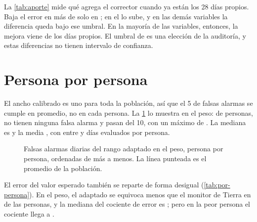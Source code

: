 La \cref{tab:aporte} mide qué agrega el corrector cuando ya están los 28 días propios. Baja el error en más de
 solo en ; en el  lo sube, y en las demás variables la
diferencia queda bajo ese umbral. En la mayoría de las variables, entonces, la mejora viene de los días propios. El
umbral de  es una elección de la auditoría, y estas diferencias no tienen intervalo de confianza.

\begin{table}[htbp]
\caption[Qué aporta el corrector de otros sujetos]{Error del valor esperado relativo al monitor de Tierra. El aporte del
corrector es la diferencia entre usar ambos y usar solo los días propios, con $k = 28$; se clasifica con una banda de
$\pm$.}
\label{tab:aporte}
\small

\end{table}

\section{Persona por persona}\label{sec:personas}

El ancho calibrado es uno para toda la población, así que el 5\pct{} de falsas alarmas se cumple en promedio, no en
cada persona. La \cref{fig:fa-persona} lo muestra en el peso: de  personas,  no
tienen ninguna falsa alarma y  pasan del 10\pct, con un máximo de \pct. La
mediana es \pct{} y la media \pct, con entre  y
 días evaluados por persona.

\begin{figure}[htbp]

\caption[Falsas alarmas del adaptado persona por persona]{Falsas alarmas diarias del rango adaptado en el peso,
persona por persona, ordenadas de más a menos. La línea punteada es el promedio de la población.}
\label{fig:fa-persona}
\end{figure}

El error del valor esperado también se reparte de forma desigual (\cref{tab:por-persona}). En el peso, el adaptado se
equivoca menos que el monitor de Tierra en  de las  personas, y la mediana del
cociente de error es ; pero en la peor persona el cociente llega a .

